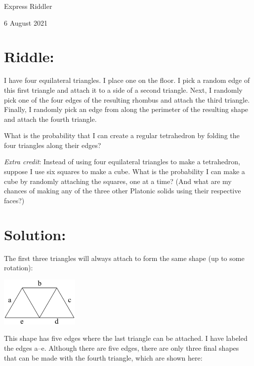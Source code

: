 \documentclass{article}
\begin{document}
\pagestyle{empty} %

\begin{center}
{\LARGE Express Riddler}

\vspace{0.15in}

{\Large 6 August 2021}
\end{center}


\section*{Riddle:}

I have four equilateral triangles.
I place one on the floor.
I pick a random edge of this first triangle and attach it to a side of a second triangle.
Next, I randomly pick one of the four edges of the resulting rhombus and attach the third triangle.
Finally, I randomly pick an edge from along the perimeter of the resulting shape and attach the fourth triangle.

What is the probability that I can create a regular tetrahedron by folding the four triangles along their edges?

\textit{Extra credit}: Instead of using four equilateral triangles to make a tetrahedron, suppose I use six squares to make a cube.
What is the probability I can make a cube by randomly attaching the squares, one at a time?
(And what are my chances of making any of the three other Platonic solids using their respective faces?)


\section*{Solution:}

The first three triangles will always attach to form the same shape (up to some rotation):

\vspace{0.1in}
\begin{center}
\includegraphics[width=1.5in]{triangles1.png}
\end{center}
\vspace{0.1in}

This shape has five edges where the last triangle can be attached.
I have labeled the edges a--e.
Although there are five edges, there are only three final shapes that can be made with the fourth triangle, which are shown here:
\end{document}
